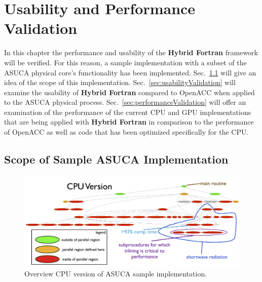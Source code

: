 \chapter{Usability and Performance Validation} \label{cha:analysis}

In this chapter the performance and usability of the \textbf{Hybrid Fortran} framework will be verified. For this reason, a sample implementation with a subset of the ASUCA physical core's functionality has been implemented. Sec.~\ref{sec:asucaRadImplementation} will give an idea of the scope of this implementation. Sec.~\ref{sec:usabilityValidation} will examine the usability of \textbf{Hybrid Fortran} compared to OpenACC when applied to the ASUCA physical process. Sec.~\ref{sec:performanceValidation} will offer an examination of the performance of the current CPU and GPU implementations that are being applied with \textbf{Hybrid Fortran} in comparison to the performance of OpenACC as well as code that has been optimized specifically for the CPU. 

\section{Scope of Sample ASUCA Implementation} \label{sec:asucaRadImplementation}

\begin{figure}[htpb]
        \centering
        \includegraphics[width=14cm]{figures/asucaPPImplementationCPU}
        \caption[CPU Version of Sample Hybrid Fortran Implementation]{Overview CPU version of ASUCA sample implementation.}
        \label{figure:asucaPPImplementationCPU}
\end{figure}

